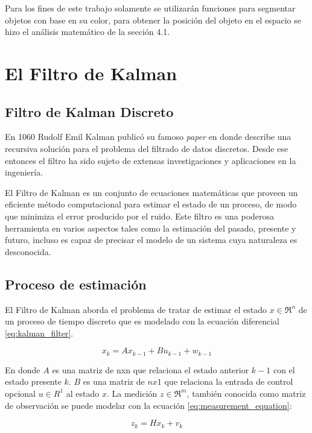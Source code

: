 Para los fines de este trabajo solamente se utilizarán funciones para segmentar objetos con base en su color, para obtener la posición del objeto en el espacio se hizo el análisis matemático de la sección 4.1.
	
	\section{El Filtro de Kalman}
		\subsection*{Filtro de Kalman Discreto}
	En 1060 Rudolf Emil Kalman publicó su famoso \textit{paper} en donde describe una recursiva solución para el problema del filtrado de datos discretos. Desde ese entonces el filtro ha sido sujeto de extensas investigaciones y aplicaciones en la ingeniería.

	El Filtro de Kalman es un conjunto de ecuaciones matemáticas que proveen un eficiente método computacional para estimar el estado de un proceso, de modo que minimiza el error producido por el ruido. Este filtro es una poderosa herramienta en varios aspectos tales como la estimación del pasado, presente y futuro, incluso es capaz de precisar el modelo de un sistema cuya naturaleza es desconocida.
	
		\subsection*{Proceso de estimación}
		El Filtro de Kalman aborda el problema de tratar de estimar el estado $x \in \Re^n$ de un proceso de tiempo discreto que es modelado con la ecuación diferencial \ref{eq:kalman_filter}.
		
\begin{equation}
x_k = Ax_{k-1} + Bu_{k-1}+w_{k-1}
\label{eq:kalman_filter}
\end{equation}

En donde $A$ es una matriz de nxn que relaciona el estado anterior $k-1$ con el estado presente $k$. $B$ es una matriz de $nx1$ que relaciona la entrada de control opcional $u \in R^1$ al estado $x$. 
La medición $z \in \Re^m$, también conocida como matriz de observación se puede modelar con la ecuación \ref{eq:measurement_equation}:

\begin{equation}
z_k = Hx_k+v_k
\label{eq:measurement_equation}
\end{equation}

